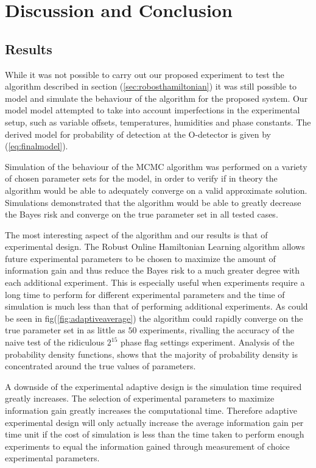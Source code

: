 
\chapter{Discussion and Conclusion} %
\label{Chapter5}

\section{Results}
While it was not possible to carry out our proposed experiment to test the algorithm described in section (\ref{sec:robosthamiltonian}) it was still possible to model and simulate the behaviour of the algorithm for the proposed system. Our model model attempted to take into account imperfections in the experimental setup, such as variable offsets, temperatures, humidities and phase constants. The derived model for probability of detection at the O-detector is given by (\ref{eq:finalmodel}).

Simulation of the behaviour of the MCMC algorithm was performed on a variety of chosen parameter sets for the model, in order to verify if in theory the algorithm would be able to adequately converge on a valid approximate solution. Simulations demonstrated that the algorithm would be able to greatly decrease the Bayes risk and converge on the true parameter set in all tested cases.   

The most interesting aspect of the algorithm and our results is that of experimental design. The Robust Online Hamiltonian Learning algorithm allows future experimental parameters to be chosen to maximize the amount of information gain and thus reduce the Bayes risk to a much greater degree with each additional experiment. This is especially useful when experiments require a long time to perform for different experimental parameters and the time of simulation is much less than that of performing additional experiments. As could be seen in fig(\ref{fig:adaptiveaverage}) the algorithm could rapidly converge on the true parameter set in as little as $50$ experiments, rivalling the accuracy of the naive test of the ridiculous $2^15$ phase flag settings experiment. Analysis of the probability density functions, shows that the majority of probability density is concentrated around the true values of parameters. 

A downside of the experimental adaptive design is the simulation time required greatly increases. The selection of experimental parameters to maximize information gain greatly increases the computational time. Therefore adaptive experimental design will only actually increase the average information gain per time unit if the cost of simulation is less than the time taken to perform enough experiments to equal the information gained through measurement of choice experimental parameters. 

